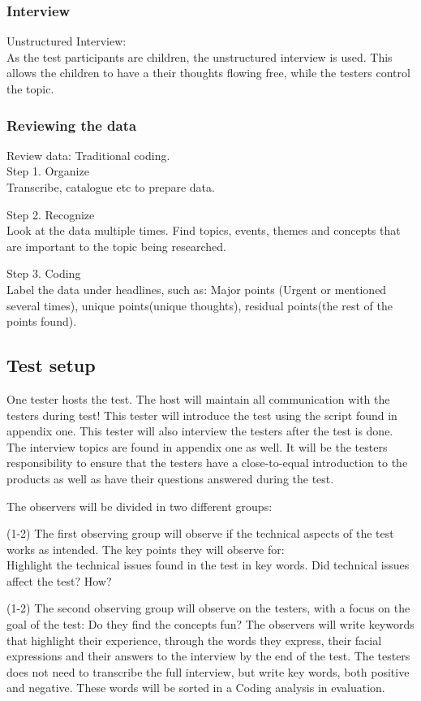 \subsubsection{Interview}
Unstructured Interview:\\
As the test participants are children, the unstructured interview is used. This allows the children to have a their thoughts flowing free, while the testers control the topic.\cite{bjoernerBog}

\subsubsection{Reviewing the data}
Review data: Traditional coding.\\
Step 1. Organize\\
Transcribe, catalogue etc to prepare data.

Step 2. Recognize\\
Look at the data multiple times. Find topics, events, themes and concepts that are important to the topic being researched.

Step 3. Coding\\
Label the data under headlines, such as: Major points (Urgent or mentioned several times), unique points(unique thoughts), residual points(the rest of the points found)\cite{bjoernerBog}.

\subsection{Test setup}
One tester hosts the test. The host will maintain all communication with the testers during test!
This tester will introduce the test using the script found in appendix one. This tester will also interview the testers after the test is done. The interview topics are found in appendix one as well. It will be the testers responsibility to ensure that the testers have a close-to-equal introduction to the products as well as have their questions answered during the test. 

The observers will be divided in two different groups:

(1-2) The first observing group will observe if the technical aspects of the test works as intended. The key points they will observe for:\\

Highlight the technical issues found in the test in key words.
Did technical issues affect the test? How?

(1-2) The second observing group will observe on the testers, with a focus on the goal of the test: Do they find the concepts fun?
The observers will write keywords that highlight their experience, through the words they express, their facial expressions and their answers to the interview by the end of the test. The testers does not need to transcribe the full interview, but write key words, both positive and negative. These words will be sorted in a Coding analysis in evaluation.

